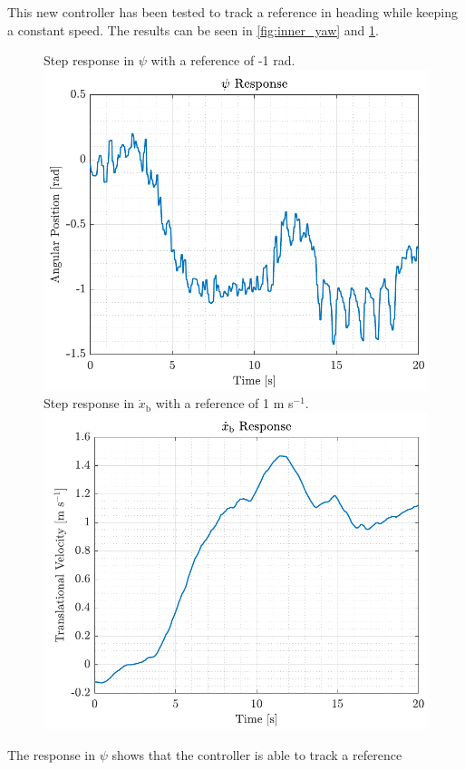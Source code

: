 This new controller has been tested to track a reference in heading while keeping a constant speed. The results can be seen in \autoref{fig:inner_yaw} and \ref{fig:inner_xbdot}.
%
\begin{figure}[H]
    \captionbox 
    {   
        Step response in $\psi$ with a reference of -1 rad.
        \label{fig:inner_yaw}
    }                                                                 
    {                                                                  
        \includegraphics[width=.45\textwidth]{figures/inner_yaw}         
    }                                                                    
    \hspace{5pt}                                                          
    \captionbox  
    {      
        Step response in $\dot{x}_\mathrm{b}$ with a reference of 1 m s$^{-1}$.
        \label{fig:inner_xbdot}
    }                                                                          
    {
        \includegraphics[width=.45\textwidth]{figures/inner_xbdot}
    }
\end{figure}

The response in $\psi$ shows that the controller is able to track a reference